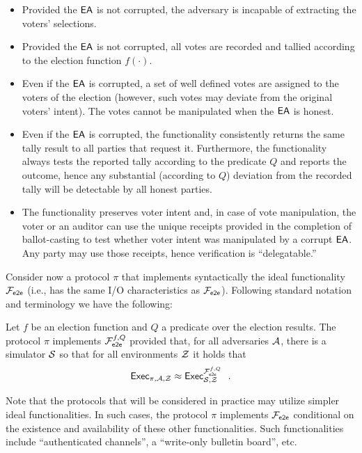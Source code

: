 \begin{itemize}
\item Provided the $\mathsf{EA}$ is not corrupted, the adversary is incapable
  of extracting the voters' selections.

\item Provided the $\mathsf{EA}$ is not corrupted, all votes are recorded and
  tallied according to the election function $f(\cdot)$.

\item Even if the $\mathsf{EA}$ is corrupted, a set of well defined votes are
  assigned to the voters of the election (however, such votes may
  deviate from the original voters' intent). The votes cannot be
  manipulated when the $\mathsf{EA}$ is honest.

\item Even if the $\mathsf{EA}$ is corrupted, the functionality consistently
  returns the same tally result to all parties that request
  it. Furthermore, the functionality always tests the reported tally
  according to the predicate $Q$ and reports the outcome, hence any
  substantial (according to $Q$) deviation from the recorded tally
  will be detectable by all honest parties.

\item The functionality preserves voter intent and, in case of vote
  manipulation, the voter or an auditor can use the unique receipts
  provided in the completion of ballot-casting to test whether voter
  intent was manipulated by a corrupt $\mathsf{EA}$. Any party may use those
  receipts, hence verification is ``delegatable.''
\end{itemize}

Consider now a protocol $\pi$ that implements syntactically the ideal
functionality $\mathcal{F}_{\mathsf{e2e}}$ (i.e., has the same I/O characteristics as
$\mathcal{F}_{\mathsf{e2e}}$). Following standard notation and terminology we have the
following:

\begin{definition}
  Let $f$ be an election function and $Q$ a predicate over the
  election results.  The protocol $\pi$ implements $\mathcal{F}_{\mathsf{e2e}}^{f,Q}$
  provided that, for all adversaries $\mathcal{A}$, there is a simulator
  $\mathcal{S}$ so that for all environments $\mathcal{Z}$ it holds that
\[ \mathsf{Exec}_{\pi, \mathcal{A}, \mathcal{Z}} \approx
\mathsf{Exec}^{\mathcal{F}_{\mathsf{e2e}}^{f,Q}}_{\mathcal{S},\mathcal{Z}}  \ \ .\]
\end{definition}

Note that the protocols that will be considered in practice may
utilize simpler ideal functionalities. In such cases, the protocol
$\pi$ implements $\mathcal{F}_{\mathsf{e2e}}$ conditional on the existence and availability
of these other functionalities. Such functionalities include
``authenticated channels'', a ``write-only bulletin board'', etc.

